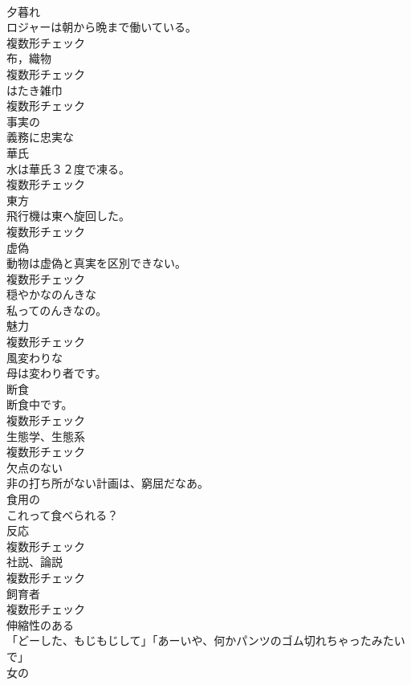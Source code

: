 \documentclass[8pt]{extreport}
\begin{document}
\begin{CJK}{UTF8}{min}
\\	[名詞]	夕暮れ	
\\	ロジャーは朝から晩まで働いている。	
\\	複数形チェック
\\	[名詞]	布，織物	
\\	複数形チェック
\\	[名詞]	はたき雑巾	
\\	複数形チェック
\\	[形容詞]	事実の	
\\	[形容詞]	義務に忠実な	
\\	[名詞]	華氏	
\\	水は華氏３２度で凍る。	
\\	複数形チェック
\\	[名詞]	東方	
\\	飛行機は東へ旋回した。	
\\	複数形チェック
\\	[名詞]	虚偽	
\\	動物は虚偽と真実を区別できない。	
\\	複数形チェック
\\	[形容詞]	穏やかなのんきな	
\\	私ってのんきなの。	
\\	[名詞]	魅力	
\\	複数形チェック
\\	[形容詞]	風変わりな	
\\	母は変わり者です。	
\\	[名詞]	断食	
\\	断食中です。	
\\	複数形チェック
\\	[名詞]	生態学、生態系	
\\	複数形チェック
\\	[形容詞]	欠点のない	
\\	非の打ち所がない計画は、窮屈だなあ。	
\\	[形容詞]	食用の	
\\	これって食べられる？	
\\	[名詞]	反応	
\\	複数形チェック
\\	[名詞]	社説、論説	
\\	複数形チェック
\\	[名詞]	飼育者	
\\	複数形チェック
\\	[形容詞]	伸縮性のある	
\\	「どーした、もじもじして」「あーいや、何かパンツのゴム切れちゃったみたいで」	
\\	[形容詞]	女の	

\end{CJK}
\end{document}

